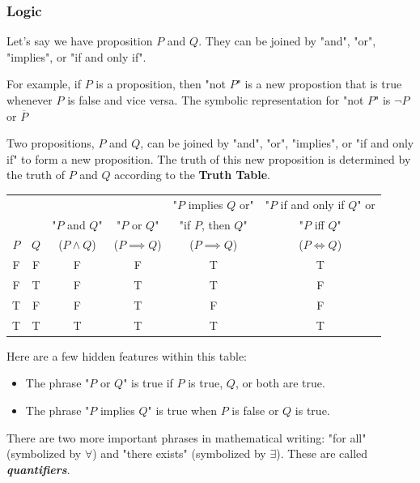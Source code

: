 
\subsubsection{Logic}
\label{sub_sub_sec:logic}

Let's say we have proposition $P$ and $Q$. They can be joined by "and", "or",
"implies", or "if and only if".

For example, if $P$ is a proposition, then "not $P$" is a new propostion that
is true whenever $P$ is false and vice versa. The symbolic representation for
"not $P$" is $\lnot P$ or $\overline{P}$ 

Two propositions, $P$ and $Q$, can be joined by "and", "or", "implies", or "if
and only if" to form a new proposition. The truth of this new proposition is
determined by the truth of $P$ and $Q$ according to the \textbf{Truth Table}.

\begin{table}[htbp]
  \centering
  \begin{tabular}{cc|cccc}
    & & & & "$P$ implies $Q$ or" & "$P$ if and only if $Q$" or \\
    & & "$P$ and $Q$" & "$P$ or $Q$" & "if $P$, then $Q$" & "$P$ iff $Q$" \\
    $P$ & $Q$ & ($P \land Q$) & ($P \implies Q$) & ($P \implies Q$) & ($P \iff Q$) \\
    \hline
    F & F & F & F & T & T \\
    F & T & F & T & T & F \\
    T & F & F & T & F & F \\
    T & T & T & T & T & T \\
  \end{tabular}
  \label{tab:truth-table}
\end{table}

Here are a few hidden features within this table:

\begin{itemize}
  \item The phrase "$P$ or $Q$" is true if $P$ is true, $Q$, or both are true.
  \item The phrase "$P$ implies $Q$" is true when $P$ is false or $Q$ is true.
\end{itemize}

There are two more important phrases in mathematical writing: "for all"
(symbolized by $\forall$) and "there exists" (symbolized by $\exists$). These
are called \textbf{\textit{quantifiers}}.

